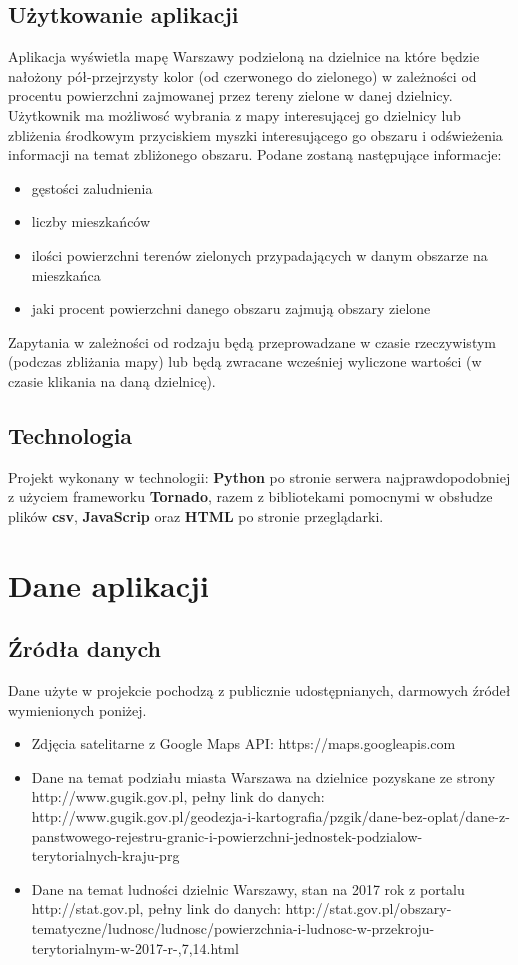 \documentclass[11pt]{article}
\begin{document}
	\subsection{Użytkowanie aplikacji}
		Aplikacja wyświetla mapę Warszawy podzieloną na dzielnice na które będzie nałożony pół-przejrzysty kolor (od czerwonego do zielonego) w zależności od procentu powierzchni zajmowanej przez tereny zielone w danej dzielnicy. Użytkownik ma możliwosć wybrania z mapy interesującej go dzielnicy lub zbliżenia środkowym przyciskiem myszki interesującego go obszaru i odświeżenia informacji na temat zbliżonego obszaru. Podane zostaną następujące informacje:
    \begin{itemize}
      \item gęstości zaludnienia
      \item liczby mieszkańców  
      \item ilości powierzchni terenów zielonych przypadających w danym obszarze na mieszkańca
      \item jaki procent powierzchni danego obszaru zajmują obszary zielone
    \end{itemize}
Zapytania w zależności od rodzaju będą przeprowadzane w czasie rzeczywistym (podczas zbliżania mapy) lub będą zwracane wcześniej wyliczone wartości (w czasie klikania na daną dzielnicę). 


	\subsection{Technologia}
		Projekt wykonany w technologii: \textbf{Python} po stronie serwera najprawdopodobniej z użyciem frameworku \textbf{Tornado}, razem z bibliotekami pomocnymi w obsłudze plików \textbf{csv}, \textbf{JavaScrip} oraz \textbf{HTML} po stronie przeglądarki.  

	
	\section{Dane aplikacji}
	\subsection{Źródła danych}
		Dane użyte w projekcie pochodzą z publicznie udostępnianych, darmowych źródeł wymienionych poniżej.
	
	\begin{itemize}
	\item Zdjęcia satelitarne z Google Maps API: https://maps.googleapis.com
	\item Dane na temat podziału miasta Warszawa na dzielnice pozyskane ze strony http://www.gugik.gov.pl, pełny link do danych: http://www.gugik.gov.pl/geodezja-i-kartografia/pzgik/dane-bez-oplat/dane-z-panstwowego-rejestru-granic-i-powierzchni-jednostek-podzialow-terytorialnych-kraju-prg
	\item Dane na temat ludności dzielnic Warszawy, stan na 2017 rok z portalu http://stat.gov.pl, pełny link do danych: http://stat.gov.pl/obszary-tematyczne/ludnosc/ludnosc/powierzchnia-i-ludnosc-w-przekroju-terytorialnym-w-2017-r-,7,14.html
	\end{itemize}
\end{document}
